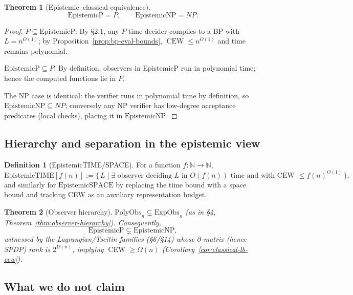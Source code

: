 \documentclass[12pt]{article}
\newtheorem{theorem}{Theorem}
\theoremstyle{definition}
\newtheorem{definition}{Definition}
\theoremstyle{definition}
\theoremstyle{remark}
\theoremstyle{remark}
\begin{document}
\begin{theorem}[Epistemic--classical equivalence]\label{thm:epistemic-classical-equiv}
\[
\mathrm{EpistemicP}=P,\qquad \mathrm{EpistemicNP}=NP.
\]
\end{theorem}

\begin{proof}
$P\subseteq\mathrm{EpistemicP}$: By \S2.1, any $P$-time decider compiles to a BP with $L=n^{O(1)}$; by Proposition~\ref{prop:bp-eval-bounds}, $\operatorname{CEW}\le n^{O(1)}$ and time remains polynomial.

$\mathrm{EpistemicP}\subseteq P$: By definition, observers in EpistemicP run in polynomial time; hence the computed functions lie in $P$.

The NP case is identical: the verifier runs in polynomial time by definition, so $\mathrm{EpistemicNP}\subseteq NP$; conversely any NP verifier has low-degree acceptance predicates (local checks), placing it in $\mathrm{EpistemicNP}$.
\end{proof}

\subsection{Hierarchy and separation in the epistemic view}

\begin{definition}[EpistemicTIME/SPACE]\label{def:epistemic-time-space}
For a function $f:\mathbb{N}\to\mathbb{N}$,
\[
\mathrm{EpistemicTIME}[f(n)] := \{\,L \mid \exists\text{ observer deciding }L\text{ in }O(f(n))\text{ time and with CEW }\le f(n)^{O(1)}\,\},
\]
and similarly for $\mathrm{EpistemicSPACE}$ by replacing the time bound with a space bound and tracking CEW as an auxiliary representation budget.
\end{definition}

\begin{theorem}[Observer hierarchy]\label{thm:observer-hierarchy-full}
$\mathrm{PolyObs}_n \subsetneq \mathrm{ExpObs}_n$ (as in \S4, Theorem~\ref{thm:observer-hierarchy}). Consequently,
\[
\mathrm{EpistemicP} \subsetneq \mathrm{EpistemicNP},
\]
witnessed by the Lagrangian/Tseitin families (\S6/\S14) whose $\partial$-matrix (hence SPDP) rank is $2^{\Omega(n)}$, implying $\operatorname{CEW}\ge\Omega(n)$ (Corollary~\ref{cor:classical-lb-cew}).
\end{theorem}

\subsection{What we do not claim}
\end{document}
